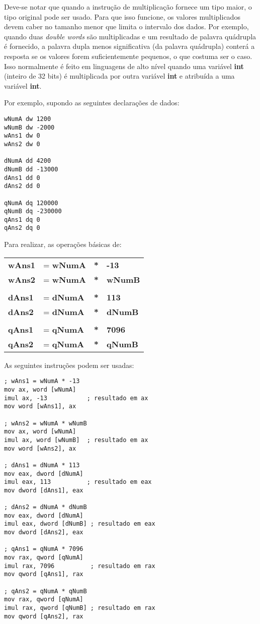 Deve-se notar que quando a instrução de multiplicação fornece um tipo maior, o tipo original pode ser usado. Para que isso funcione, os valores multiplicados devem caber no tamanho menor que limita o intervalo dos dados. Por exemplo, quando duas \textit{double words} são multiplicadas e um resultado de palavra quádrupla é fornecido, a palavra dupla menos significativa (da palavra quádrupla) conterá a resposta se os valores forem suficientemente pequenos, o que costuma ser o caso. Isso normalmente é feito em linguagens de alto nível quando uma variável \textbf{int} (inteiro de 32 bits) é multiplicada por outra variável \textbf{int} e atribuída a uma variável \textbf{int}.

Por exemplo, supondo as seguintes declarações de dados:

\begin{lstlisting}
wNumA dw 1200
wNumB dw -2000
wAns1 dw 0
wAns2 dw 0

dNumA dd 4200
dNumB dd -13000
dAns1 dd 0
dAns2 dd 0

qNumA dq 120000
qNumB dq -230000
qAns1 dq 0
qAns2 dq 0
\end{lstlisting}

Para realizar, as operações básicas de:\\
\begin{tabular}{llcl}
	\textbf{wAns1} & = \textbf{wNumA} &\textbf{*}& \textbf{-13}\\
	\textbf{wAns2} & = \textbf{wNumA} &\textbf{*}& \textbf{wNumB}\\
	& & &\\
	\textbf{dAns1} & = \textbf{dNumA} &\textbf{*}& \textbf{113}\\
	\textbf{dAns2} & = \textbf{dNumA} &\textbf{*}& \textbf{dNumB}\\
		& & &\\
	\textbf{qAns1} & = \textbf{qNumA} &\textbf{*}& \textbf{7096}\\
	\textbf{qAns2} & = \textbf{qNumA} &\textbf{*}& \textbf{qNumB}\\
\end{tabular}

As seguintes instruções podem ser usadas:
\begin{lstlisting}
; wAns1 = wNumA * -13
mov ax, word [wNumA]
imul ax, -13           ; resultado em ax
mov word [wAns1], ax

; wAns2 = wNumA * wNumB
mov ax, word [wNumA]
imul ax, word [wNumB]  ; resultado em ax
mov word [wAns2], ax

; dAns1 = dNumA * 113
mov eax, dword [dNumA]
imul eax, 113          ; resultado em eax
mov dword [dAns1], eax

; dAns2 = dNumA * dNumB
mov eax, dword [dNumA]
imul eax, dword [dNumB] ; resultado em eax
mov dword [dAns2], eax

; qAns1 = qNumA * 7096
mov rax, qword [qNumA]
imul rax, 7096          ; resultado em rax
mov qword [qAns1], rax

; qAns2 = qNumA * qNumB
mov rax, qword [qNumA]
imul rax, qword [qNumB] ; resultado em rax
mov qword [qAns2], rax
\end{lstlisting}

